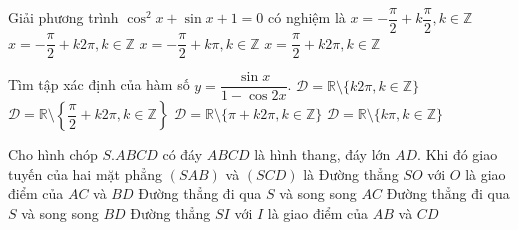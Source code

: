 \begin{ex}%
	Giải phương trình $ \cos^2x+\sin x+1=0 $ có nghiệm là
	\choice
	{$ x=-\dfrac{\pi}{2}+k\dfrac{\pi}{2},k\in\mathbb{Z} $}
	{\True $ x=-\dfrac{\pi}{2}+k2\pi,k\in\mathbb{Z} $}
	{$ x=-\dfrac{\pi}{2}+k\pi,k\in\mathbb{Z} $}
	{$ x=\dfrac{\pi}{2}+k2\pi,k\in\mathbb{Z} $}
\end{ex}
\begin{ex}%
	Tìm tập xác định của hàm số $ y=\dfrac{\sin x}{1-\cos2x} $.
	\choice
	{$ \mathscr{D}=\mathbb{R}\setminus\{k2\pi,k\in\mathbb{Z}\} $}
	{$ \mathscr{D}=\mathbb{R}\setminus\left\{\dfrac{\pi}{2}+k2\pi,k\in\mathbb{Z}\right\} $}
	{$ \mathscr{D}=\mathbb{R}\setminus\{\pi+k2\pi,k\in\mathbb{Z}\} $}
	{\True $ \mathscr{D}=\mathbb{R}\setminus\{k\pi,k\in\mathbb{Z}\} $}
\end{ex}
\begin{ex}%
	Cho hình chóp $ S.ABCD $ có đáy $ ABCD $ là hình thang, đáy lớn $ AD $. Khi đó giao tuyến của hai mặt phẳng $ (SAB) $ và $ (SCD) $ là
	\choice
	{Đường thẳng $ SO $ với $ O $ là giao điểm của $ AC $ và $ BD $}
	{Đường thẳng đi qua $ S $ và song song $ AC $}
	{Đường thẳng đi qua $ S $ và song song $ BD $}
	{\True Đường thẳng $ SI $ với $ I $ là giao điểm của $ AB $ và $ CD $}
\end{ex}
